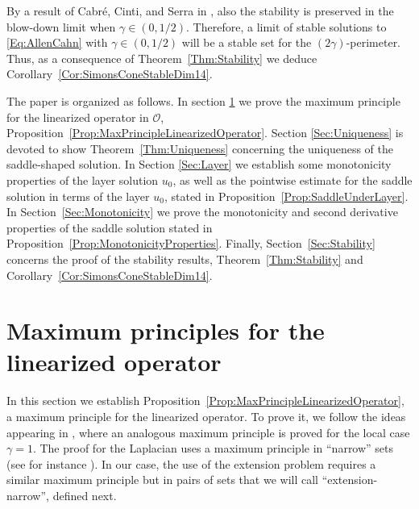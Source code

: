 \documentclass[twoside,leqno,symbols-for-thanks, draft]{rmi}
\numberwithin{equation}{section}
\theoremstyle{definition}
\newcommand{\ocal}{\mathcal{O}}
\newcommand{\s}{\gamma}
\begin{document}
By a result of Cabr\'e, Cinti, and Serra in \cite{CabreCintiSerra-Stable}, also the stability is preserved in the blow-down limit when $\s\in(0,1/2)$. Therefore, a limit of stable solutions to \eqref{Eq:AllenCahn} with $\s \in (0,1/2)$ will be a stable set for the $(2\s)$-perimeter. Thus, as a consequence of Theorem~\ref{Thm:Stability} we deduce Corollary~\ref{Cor:SimonsConeStableDim14}.

The paper is organized as follows. In section \ref{Sec:MaximumPrinciple} we prove the maximum principle for the linearized operator in $\ocal$, Proposition~\ref{Prop:MaxPrincipleLinearizedOperator}. Section \ref{Sec:Uniqueness} is devoted to show Theorem~\ref{Thm:Uniqueness} concerning the uniqueness of the saddle-shaped solution. In Section \ref{Sec:Layer} we establish some monotonicity properties of the layer solution $u_0$, as well as the pointwise estimate for the saddle solution in terms of the layer $u_0$, stated in Proposition~\ref{Prop:SaddleUnderLayer}. In Section~\ref{Sec:Monotonicity} we prove the monotonicity and second derivative properties of the saddle solution stated in Proposition~\ref{Prop:MonotonicityProperties}. Finally, Section~\ref{Sec:Stability} concerns the proof of the stability results, Theorem~\ref{Thm:Stability} and  Corollary~\ref{Cor:SimonsConeStableDim14}.





\section{Maximum principles for the linearized operator}
\label{Sec:MaximumPrinciple}

In this section we establish Proposition~\ref{Prop:MaxPrincipleLinearizedOperator}, a maximum principle for the linearized operator. To prove it, we follow the ideas appearing in \cite{Cabre-Saddle}, where an analogous maximum principle is proved for the local case $\s = 1$. The proof for the Laplacian uses a maximum principle in ``narrow'' sets (see for instance \cite{Cabre-Topics,BerestyckiNirembergVaradhan}). In our case, the use of the extension problem requires a similar maximum principle but in pairs of sets that we will call ``extension-narrow''\!, defined next.
\end{document}
